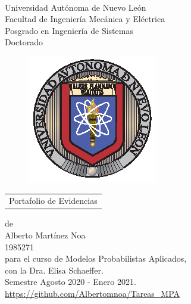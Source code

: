 \thispagestyle{empty}
\vspace{10 cm}
\begin{scshape}
\begin{center}
	{$\,$} \\[20 mm]
	{\Large{Universidad Autónoma de Nuevo León}} \\[5mm]
	{\large{Facultad de Ingeniería Mecánica y Eléctrica}} \\[5mm]
	{\large{Posgrado en Ingeniería de Sistemas}} \\[5 mm]
	{\large{Doctorado}}
	\vskip16mm
	\begin{figure}[h!]
		\centering
		\includegraphics[scale=1]{uanl.eps}
	\end{figure}
	\vskip16mm
	\begin{tabular}{p{11cm}}
		\centering
		{\large Portafolio de Evidencias}
	\end{tabular}
	\vskip7mm
	{de}\\[7mm]
	{\large Alberto Martínez Noa}\\[3mm]
	{1985271}\\[7 mm]
	{para el curso de Modelos Probabilistas Aplicados,}\\[3mm]
	{con la Dra. Elisa Schaeffer.}\\[3mm]
	Semestre Agosto 2020 - Enero 2021. \\ [5 mm]
	\url{https://github.com/Albertomnoa/Tareas_MPA}
	\vfill
\end{center}
\end{scshape}